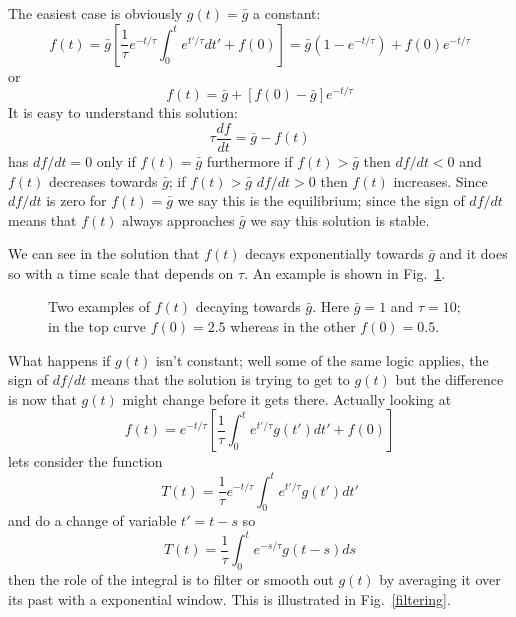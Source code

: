 \documentclass{article}
\begin{document}
The easiest case is obviously $g(t)=\bar{g}$ a constant:
\begin{equation}
f(t)= \bar{g} \left[\frac{1}{\tau}e^{-t/\tau}\int_0^t e^{t'/\tau}dt'+f(0)\right]=\bar{g}\left(1-e^{-t/\tau}\right) + f(0)e^{-t/\tau}
\end{equation}
or
\begin{equation}
f(t)=\bar{g}+[f(0)-\bar{g}]e^{-t/\tau}
\end{equation}
It is easy to understand this solution: 
\begin{equation}
\tau\frac{df}{dt}=\bar{g}-f(t)
\end{equation}
has $df/dt=0$ only if $f(t)=\bar{g}$ furthermore if $f(t)>\bar{g}$
then $df/dt<0$ and $f(t)$ decreases towards $\bar{g}$; if
$f(t)>\bar{g}$ $df/dt>0$ then $f(t)$ increases. Since $df/dt$ is zero
for $f(t)=\bar{g}$ we say this is the equilibrium; since the sign of
$df/dt$ means that $f(t)$ always approaches $\bar{g}$ we say this
solution is stable.


We can see in the
solution that $f(t)$ decays exponentially towards $\bar{g}$ and it
does so with a time scale that depends on $\tau$. An example is shown in Fig.~\ref{exp_decay}.

\begin{figure}[tb]
\begin{center}

\end{center}
\caption{Two examples of $f(t)$ decaying towards $\bar{g}$. Here
  $\bar{g}=1$ and $\tau=10$; in the top curve $f(0)=2.5$ whereas in
  the other $f(0)=0.5$. \label{exp_decay}}
\end{figure}

What happens if $g(t)$ isn't constant; well some of the same logic applies, the sign of $df/dt$ means that the solution is trying to get to $g(t)$ but the difference is now that $g(t)$ might change before it gets there. Actually looking at 
\begin{equation}
f(t)=e^{-t/\tau}\left[\frac{1}{\tau}\int_0^t e^{t'/\tau} g(t')dt'+f(0)\right]
\end{equation}
lets consider the function
\begin{equation}
T(t)=\frac{1}{\tau}e^{-t/\tau}\int_0^t e^{t'/\tau} g(t')dt'
\end{equation}
and do a change of variable $t'=t-s$ so 
\begin{equation}
T(t)=\frac{1}{\tau}\int_0^t e^{-s/\tau} g(t-s)ds
\end{equation}
then the role of the integral is to filter or smooth out $g(t)$ by
averaging it over its past with a exponential window. This is
illustrated in Fig.~\ref{filtering}.
\end{document}
